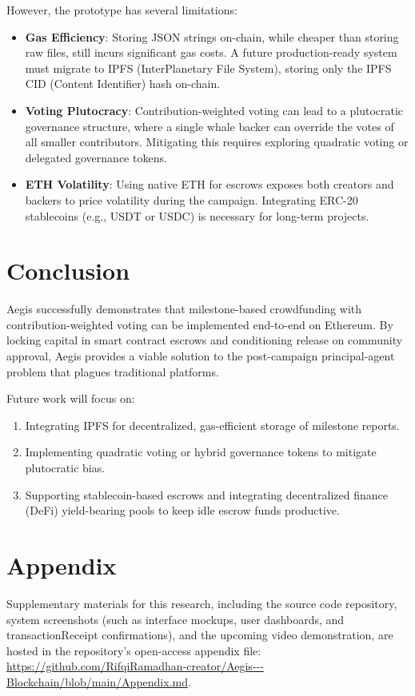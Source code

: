 \documentclass[conference]{IEEEtran}
\begin{document}
However, the prototype has several limitations:
\begin{itemize}
	\item \textbf{Gas Efficiency}: Storing JSON strings on-chain, while cheaper than storing raw files, still incurs significant gas costs. A future production-ready system must migrate to IPFS (InterPlanetary File System), storing only the IPFS CID (Content Identifier) hash on-chain.
	\item \textbf{Voting Plutocracy}: Contribution-weighted voting can lead to a plutocratic governance structure, where a single whale backer can override the votes of all smaller contributors. Mitigating this requires exploring quadratic voting or delegated governance tokens.
	\item \textbf{ETH Volatility}: Using native ETH for escrows exposes both creators and backers to price volatility during the campaign. Integrating ERC-20 stablecoins (e.g., USDT or USDC) is necessary for long-term projects.
\end{itemize}

\section{Conclusion}
Aegis successfully demonstrates that milestone-based crowdfunding with contribution-weighted voting can be implemented end-to-end on Ethereum. By locking capital in smart contract escrows and conditioning release on community approval, Aegis provides a viable solution to the post-campaign principal-agent problem that plagues traditional platforms. 

Future work will focus on:
\begin{enumerate}
	\item Integrating IPFS for decentralized, gas-efficient storage of milestone reports.
	\item Implementing quadratic voting or hybrid governance tokens to mitigate plutocratic bias.
	\item Supporting stablecoin-based escrows and integrating decentralized finance (DeFi) yield-bearing pools to keep idle escrow funds productive.
\end{enumerate}

\section*{Appendix}
Supplementary materials for this research, including the source code repository, system screenshots (such as interface mockups, user dashboards, and transactionReceipt confirmations), and the upcoming video demonstration, are hosted in the repository's open-access appendix file: \url{https://github.com/RifqiRamadhan-creator/Aegis---Blockchain/blob/main/Appendix.md}.
\end{document}
